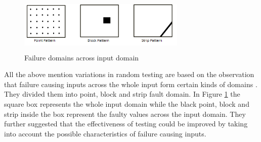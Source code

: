 \documentclass{acm_proc_article-sp}
\begin{document}
\begin{figure}[h]
\centering
\includegraphics[width=8cm,height=2.7cm]{ART_Patterns.png}
\caption{Failure domains across input domain \cite{Chan1996}}
\label{fig:patterns}
\end{figure}


All the above mention variations in random testing are based on the observation that failure causing inputs across the whole input form certain kinds of domains \cite{Chan1996}.  They divided them into point, block and strip fault domain. In Figure \ref{fig:patterns} the square box represents the whole input domain while the black point, block and strip inside the box represent the faulty values across the input domain. They further suggested that the effectiveness of testing could be improved by taking into account the possible characteristics of failure causing inputs.





\end{document}

